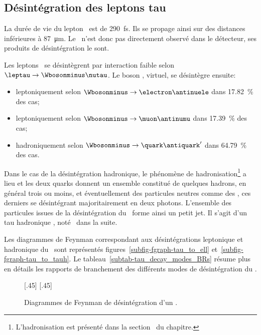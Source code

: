 \subsection{Désintégration des leptons tau}\label{chapter-MS-MSSM-section-pheno_Higgs_MSSM-subsec-desintegration_lepton_tau}
La durée de vie du lepton \tau\ est de \SI{290}{\femto\second}. Ils se propage ainsi sur des distances inférieures à \SI{87}{\micro\meter}.
Le \tau\ n'est donc pas directement observé dans le détecteur, ses produits de désintégration le sont.
\par Les leptons \tau\ se désintègrent par interaction faible selon $\leptau\to\Wbosonminus\nutau$.
Le boson \Wboson, virtuel, se désintègre ensuite:
\begin{itemize}
\item leptoniquement selon $\Wbosonminus\to\electron\antinuele$ dans \SI{17.82}{\%} des cas;
\item leptoniquement selon $\Wbosonminus\to\muon\antinumu$ dans \SI{17.39}{\%} des cas;
\item hadroniquement selon $\Wbosonminus\to\quark\antiquark'$ dans \SI{64.79}{\%} des cas.
\end{itemize}
\par Dans le cas de la désintégration hadronique, le phénomène de hadronisation\footnote{L'hadronisation est présenté dans la section~ du chapitre.} a lieu et les deux quarks donnent un ensemble constitué de quelques hadrons, en général trois ou moins, et éventuellement des particules neutres comme des \pionnull, ces derniers se désintégrant majoritairement en deux photons.
L'ensemble des particules issues de la désintégration du \Wboson\ forme ainsi un petit jet.
Il s'agit d'un \og tau hadronique \fg, noté \tauh\ dans la suite.
\par Les diagrammes de Feynman correspondant aux désintégrations leptonique et hadronique du \tau\ sont représentés figures~\ref{subfig-fgraph-tau_to_ell} et~\ref{subfig-fgraph-tau_to_tauh}.
Le tableau~\ref{subtab-tau_decay_modes_BRs} résume plus en détails les rapports de branchement des différents modes de désintégration du \tau.
\begin{figure}[h]
\centering
\vspace{\baselineskip}
[.45\textwidth]
{\vspace{\baselineskip}}
\hfill
{}[.45\textwidth]
{\vspace{\baselineskip}}
\caption{Diagrammes de Feynman de désintégration d'un \leptau.}
\label{fig-fgraph-tau_to_ell_and_tauh}
\end{figure}
